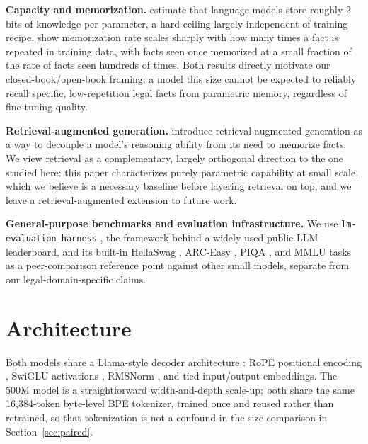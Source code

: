\documentclass[11pt]{article}
\begin{document}
\textbf{Capacity and memorization.} \citet{allenzhu2024physics} estimate
that language models store roughly 2 bits of knowledge per parameter, a
hard ceiling largely independent of training recipe. \citet{carlini2022quantifying}
show memorization rate scales sharply with how many times a fact is
repeated in training data, with facts seen once memorized at a small
fraction of the rate of facts seen hundreds of times. Both results
directly motivate our closed-book/open-book framing: a model this size
cannot be expected to reliably recall specific, low-repetition legal
facts from parametric memory, regardless of fine-tuning quality.

\textbf{Retrieval-augmented generation.} \citet{lewis2020rag} introduce
retrieval-augmented generation as a way to decouple a model's reasoning
ability from its need to memorize facts. We view retrieval as a
complementary, largely orthogonal direction to the one studied here: this
paper characterizes purely parametric capability at small scale, which we
believe is a necessary baseline before layering retrieval on top, and we
leave a retrieval-augmented extension to future work.

\begin{sloppypar}
\textbf{General-purpose benchmarks and evaluation infrastructure.} We use
\texttt{lm-evaluation-harness} \citep{eval-harness}, the framework behind
a widely used public LLM leaderboard, and its built-in HellaSwag
\citep{zellers2019hellaswag}, ARC-Easy \citep{clark2018arc}, PIQA
\citep{bisk2020piqa}, and MMLU \citep{hendrycks2021mmlu} tasks as a
peer-comparison reference point against other small models, separate from
our legal-domain-specific claims.
\end{sloppypar}

\section{Architecture}

Both models share a Llama-style decoder architecture
\citep{touvron2023llama}: RoPE positional encoding \citep{su2021roformer},
SwiGLU activations \citep{shazeer2020glu}, RMSNorm \citep{zhang2019rmsnorm},
and tied input/output embeddings. The 500M model is a straightforward
width-and-depth scale-up; both share the same 16{,}384-token byte-level
BPE tokenizer, trained once and reused rather than retrained, so that
tokenization is not a confound in the size comparison in
Section~\ref{sec:paired}.
\end{document}
